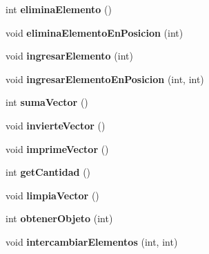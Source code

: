 \begin{DoxyCompactItemize}
\item 
\hypertarget{class_arreglo_a61c4fdfea6a6b0ddfc122b0a5f08bdaf}{int {\bfseries elimina\-Elemento} ()}\label{class_arreglo_a61c4fdfea6a6b0ddfc122b0a5f08bdaf}

\item 
\hypertarget{class_arreglo_a12c2c9b70cc07b995867b78e9a0503ec}{void {\bfseries elimina\-Elemento\-En\-Posicion} (int)}\label{class_arreglo_a12c2c9b70cc07b995867b78e9a0503ec}

\item 
\hypertarget{class_arreglo_ae79fadb9d82f3347ab530a41e85d4074}{void {\bfseries ingresar\-Elemento} (int)}\label{class_arreglo_ae79fadb9d82f3347ab530a41e85d4074}

\item 
\hypertarget{class_arreglo_a826229fc53805bfc3d21acc4796c41e6}{void {\bfseries ingresar\-Elemento\-En\-Posicion} (int, int)}\label{class_arreglo_a826229fc53805bfc3d21acc4796c41e6}

\item 
\hypertarget{class_arreglo_ae49f1f00f63ebc50abe3476aa47fe73a}{int {\bfseries suma\-Vector} ()}\label{class_arreglo_ae49f1f00f63ebc50abe3476aa47fe73a}

\item 
\hypertarget{class_arreglo_a6097e00460718fbca2acd4a37338c889}{void {\bfseries invierte\-Vector} ()}\label{class_arreglo_a6097e00460718fbca2acd4a37338c889}

\item 
\hypertarget{class_arreglo_a0e5b27630670eef5845a322355680680}{void {\bfseries imprime\-Vector} ()}\label{class_arreglo_a0e5b27630670eef5845a322355680680}

\item 
\hypertarget{class_arreglo_ae05da3f7e31fa6ba492fb4211bfbce63}{int {\bfseries get\-Cantidad} ()}\label{class_arreglo_ae05da3f7e31fa6ba492fb4211bfbce63}

\item 
\hypertarget{class_arreglo_ae9db8efe3a5da28a7251864d8843786b}{void {\bfseries limpia\-Vector} ()}\label{class_arreglo_ae9db8efe3a5da28a7251864d8843786b}

\item 
\hypertarget{class_arreglo_a78d55cb2ea8387f4080206ee24e0a4f5}{int {\bfseries obtener\-Objeto} (int)}\label{class_arreglo_a78d55cb2ea8387f4080206ee24e0a4f5}

\item 
\hypertarget{class_arreglo_a192509bbbe51caa8e114b65e08008dba}{void {\bfseries intercambiar\-Elementos} (int, int)}\label{class_arreglo_a192509bbbe51caa8e114b65e08008dba}


\end{DoxyCompactItemize}
